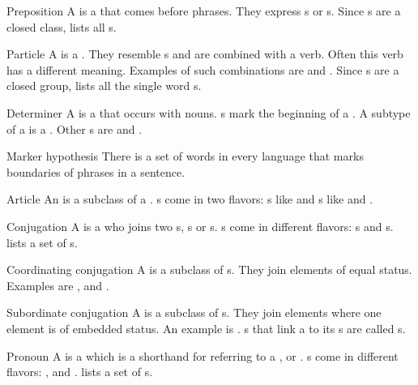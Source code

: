 \begin{df}{Preposition}
A \sb{} is a  that comes before  phrases. They express s or s. Since \sb{}s are a closed class,  lists all \sb{}s.
\end{df}
\begin{df}{Particle}
A \sb{} is a . They resemble s and are combined with a verb. Often this verb has a different meaning. Examples of such combinations are  and . Since \sb{}s are a closed group,  lists all the single word \sb{}s.
\end{df}
\begin{df}{Determiner}
A \sb{} is a  that occurs with nouns. \sb{}s mark the beginning of a . A subtype of a \sb{} is a . Other \sb{}s are  and .
\end{df}
\begin{tm}{Marker hypothesis}
There is a set of words in every language that marks boundaries of phrases in a sentence.
\end{tm}
\begin{df}{Article}
An \sb{} is a subclass of a . \sb{}s come in two flavors: s like  and s like  and .
\end{df}
\begin{df}{Conjugation}
A \sb{} is a  who joins two s, s or s. \sb{}s come in different flavors: s and s.  lists a set of \sb{}s.
\end{df}
\begin{df}{Coordinating conjugation}
A \sb{} is a subclass of s. They join elements of equal status. Examples are ,  and .
\end{df}
\begin{df}{Subordinate conjugation}
A \sb{} is a subclass of s. They join elements where one element is of embedded status. An example is . \sb{}s that link a  to its s are called s.
\end{df}
\begin{df}{Pronoun}
A \sb{} is a  which is a shorthand for referring to a ,  or . \sb{}s come in different flavors: ,  and .  lists a set of \sb{}s.
\end{df}
